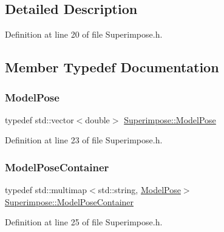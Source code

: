 \subsection{Detailed Description}


Definition at line 20 of file Superimpose.\+h.



\subsection{Member Typedef Documentation}
\mbox{\label{classSuperimpose_a85d40a5caf19f486d1e0c15c0a025378}} 
\subsubsection{\texorpdfstring{Model\+Pose}{ModelPose}}
{\footnotesize\ttfamily typedef std\+::vector$<$double$>$ \mbox{\hyperlink{classSuperimpose_a85d40a5caf19f486d1e0c15c0a025378}{Superimpose\+::\+Model\+Pose}}}



Definition at line 23 of file Superimpose.\+h.

\mbox{\label{classSuperimpose_a178e3d4e2def6635bfcf9454dd4b5d22}} 
\subsubsection{\texorpdfstring{Model\+Pose\+Container}{ModelPoseContainer}}
{\footnotesize\ttfamily typedef std\+::multimap$<$std\+::string, \mbox{\hyperlink{classSuperimpose_a85d40a5caf19f486d1e0c15c0a025378}{Model\+Pose}}$>$ \mbox{\hyperlink{classSuperimpose_a178e3d4e2def6635bfcf9454dd4b5d22}{Superimpose\+::\+Model\+Pose\+Container}}}



Definition at line 25 of file Superimpose.\+h.

\mbox{\label{classSuperimpose_a1e02e0225687b42296dcfee4eadf8a55}} 
